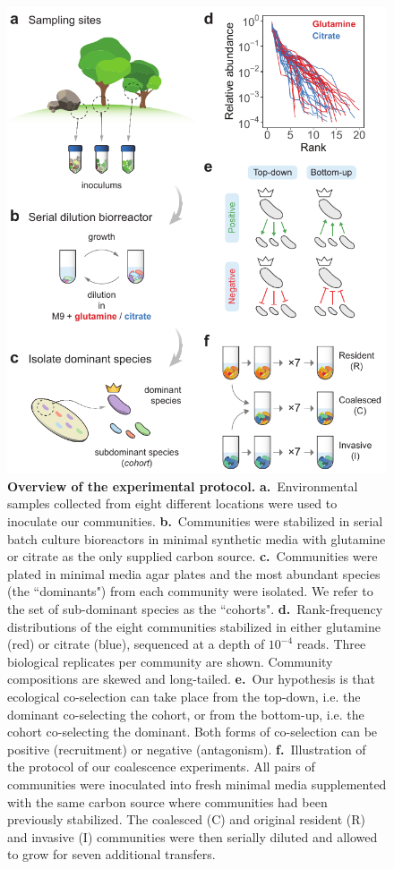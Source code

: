 \documentclass[a4paper,10pt]{article}
\begin{document}
\begin{figure}[!h]
\centering
\internallinenumbers
\includegraphics[scale=0.7,keepaspectratio]{figs/fig1.pdf}
\caption{\textbf{Overview of the experimental protocol.}
\textbf{a.}~Environmental samples collected from eight different locations were used
to inoculate our communities.
\textbf{b.}~Communities were stabilized in serial batch culture bioreactors
in minimal synthetic media with glutamine or citrate as the
only supplied carbon source.
\textbf{c.}~Communities were plated in minimal media agar plates and the most abundant
species (the ``dominants") from each community were isolated. We refer to the set of
sub-dominant species as the ``cohorts".
\textbf{d.}~Rank-frequency distributions of the eight communities stabilized in either
glutamine (red) or citrate (blue), sequenced at a depth of $10^{-4}$ reads.
Three biological replicates per community are shown.
Community compositions are skewed and long-tailed.
\textbf{e.}~Our hypothesis is that ecological co-selection can take place from the top-down,
i.e. the dominant co-selecting the cohort, or from the bottom-up, i.e. the cohort co-selecting
the dominant. Both forms of co-selection can be positive (recruitment) or negative
(antagonism).
\textbf{f.}~Illustration of the protocol of our coalescence experiments. All pairs of
communities were inoculated into fresh minimal media supplemented with the same carbon
source where communities had been previously stabilized. The coalesced (C) and original
resident (R) and invasive (I) communities were then serially diluted and allowed to grow
for seven additional transfers.}
\label{fig1}
\end{figure}
\end{document}
